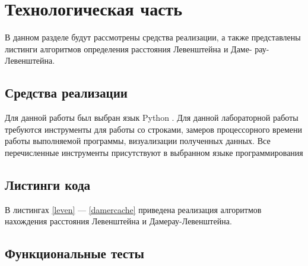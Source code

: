 \chapter{Технологическая часть}
В данном разделе будут рассмотрены средства реализации, а также представлены листинги алгоритмов определения расстояния Левенштейна и Даме- рау-Левенштейна.
\section{Средства реализации}
Для данной работы был выбран язык Python \cite{python}. Для данной лабораторной работы требуются инструменты для работы со строками, замеров процессорного времени работы выполняемой программы, визуализации полученных данных. Все перечисленные инструменты присутствуют в выбранном языке программирования


\section{Листинги кода}
В листингах \ref{leven} --- \ref{damercache} приведена реализация алгоритмов нахождения расстояния Левенштейна и Дамерау-Левенштейна.




\pagebreak


\clearpage



\section{Функциональные тесты}

